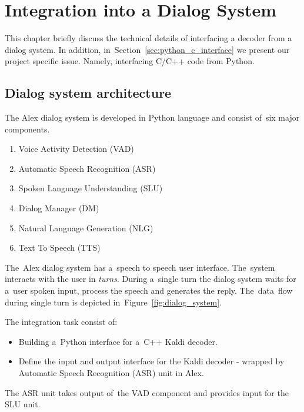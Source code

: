 \chapter{Integration into a Dialog System}
\label{cha:integration}
This chapter briefly discuss the technical details of interfacing
a decoder from a dialog system.
In addition, in~Section~\ref{sec:python_c_interface} we present our project specific issue.
Namely, interfacing C/C++ code from Python.






\section{Dialog system architecture} 
\label{sec:dialog_system_architecture}
The Alex dialog system is developed in Python language and consist of~six major components. 
\begin{enumerate}
    \item Voice Activity Detection (VAD)
    \item Automatic Speech Recognition (ASR) 
    \item Spoken Language Understanding (SLU)
    \item Dialog Manager (DM)
    \item Natural Language Generation (NLG)
    \item Text To Speech (TTS)
\end{enumerate}
The~Alex dialog system has a~speech to speech user interface. The~system interacts with the user in {\it turns}. During a~single turn the dialog system waits for a~user spoken input, process the speech and generates the reply.
The~data~flow during single turn is depicted in~Figure~\ref{fig:dialog_system}.

The integration task consist of:
\begin{itemize}
    \item Building a~Python interface for a~C++ Kaldi decoder.
    \item Define the input and output interface for the Kaldi decoder - wrapped by Automatic Speech Recognition (ASR) unit in Alex.
\end{itemize}
 The ASR unit takes output of~the VAD component and provides input for the SLU unit. 

